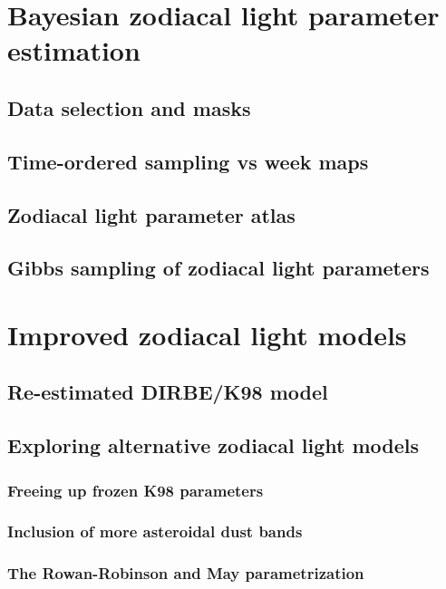 \documentclass{aa}
\begin{document}
\section{Bayesian zodiacal light parameter estimation}
\subsection{Data selection and masks}
\subsection{Time-ordered sampling vs week maps}
\subsection{Zodiacal light parameter atlas}
\subsection{Gibbs sampling of zodiacal light parameters}

\section{Improved zodiacal light models}
\subsection{Re-estimated DIRBE/K98 model}
\subsection{Exploring alternative zodiacal light models}
\subsubsection{Freeing up frozen K98 parameters}
\subsubsection{Inclusion of more asteroidal dust bands}
\subsubsection{The Rowan-Robinson and May parametrization}
\end{document}
